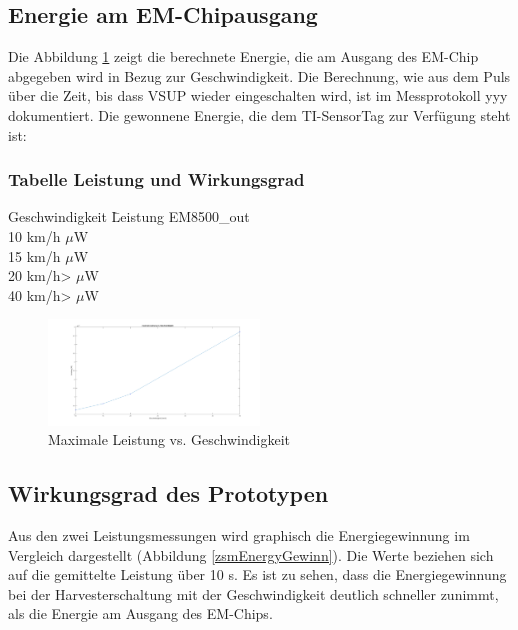 \newpage  %
\subsection{Energie am EM-Chipausgang}

Die Abbildung \ref{energie_resultat_harvester} zeigt die berechnete Energie, die am Ausgang des EM-Chip abgegeben wird in Bezug zur Geschwindigkeit. Die Berechnung, wie aus dem Puls über die Zeit, bis dass VSUP wieder eingeschalten wird, ist im  Messprotokoll yyy dokumentiert. Die gewonnene Energie, die dem TI-SensorTag zur Verfügung steht ist:

\subsubsection*{Tabelle Leistung und Wirkungsgrad }
\begin{tabbing}
    Geschwindigkeit \quad\= Leistung EM8500\_out \\[0.8ex]
    10 km/h     $\mu$W\\
    15 km/h    $\mu$W\\
    20 km/h>   $\mu$W\\
    40 km/h>  $\mu$W\\
\end{tabbing}  


\begin{figure}[ht]
    \includegraphics[width=0.5\textwidth]{4Resultate/imag/ResultatLeistungGeschwindigkeit.png} 
    \caption{Maximale Leistung vs. Geschwindigkeit}
    \label{energie_resultat_harvester}
\end{figure}

\subsection{Wirkungsgrad des Prototypen}

Aus den zwei Leistungsmessungen wird graphisch die Energiegewinnung im Vergleich dargestellt (Abbildung \ref{zsmEnergyGewinn}). Die Werte beziehen sich auf die gemittelte Leistung über 10 s. Es ist zu sehen, dass die Energiegewinnung bei der Harvesterschaltung mit der Geschwindigkeit deutlich schneller zunimmt, als die Energie am Ausgang des EM-Chips. 

